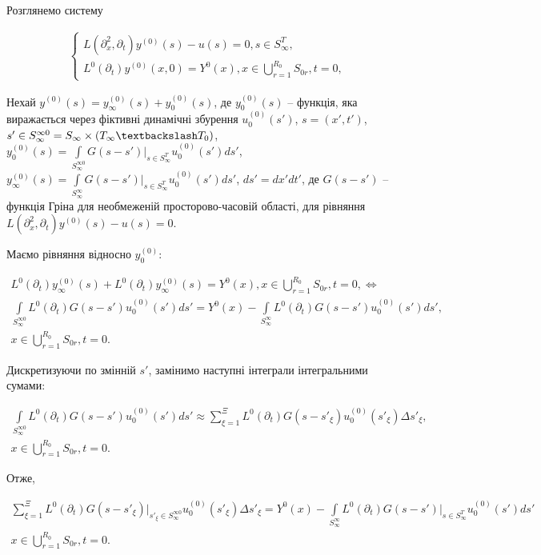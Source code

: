 Розглянемо систему

\begin{gather*}
    \left\{
    \begin{alignedat}{2}
        L(\partial_x^2, \partial_t)y^{(0)}(s) - u(s) = 0, s\in S_\infty^T,\\
        L^{0}(\partial_{t})y^{(0)}(x,0) = Y^{0}(x),x\in\bigcup\limits_{r=1}^{R_{0}} S_{0r},t=0,
    \end{alignedat}
    \right.
\end{gather*}

Нехай $y^{(0)}(s)=y_{\infty}^{(0)}(s) + y_{0}^{(0)}(s)$,
де $y_{0}^{(0)}(s)$ -- функція, яка виражається через фіктивні динамічні збурення
$u^{(0)}_{0}(s')$,
$s=(x', t')$,
$s'\in S_{\infty}^{\infty 0} = S_{\infty} \times (T_{\infty}\textbackslash T_{0})$,
$y_{0}^{(0)}(s)=\int\limits_{S_{\infty}^{\infty 0}}G(s-s')\bigg|_{s\in S_{\infty}^{T}}u_{0}^{(0)}(s')ds'$,
$y_{\infty}^{(0)}(s)=\int\limits_{S_{\infty}^{\infty}}G(s-s')\bigg|_{s\in S_{\infty}^{T}}u_{0}^{(0)}(s')ds'$,
$ds'=dx'dt'$,
де $G(s-s')$ -- функція Гріна для необмеженій просторово-часовій області, для рівняння
$L(\partial_x^2, \partial_t)y^{(0)}(s) - u(s) = 0$.

Маємо рівняння відносно $y_{0}^{(0)}$:

\begin{gather*}
L^{0}(\partial_{t})y_{\infty}^{(0)}(s) + L^{0}(\partial_{t})y_{\infty}^{(0)}(s) = Y^{0}(x),
x\in\bigcup\limits_{r=1}^{R_{0}} S_{0r},t=0,\Leftrightarrow\\
    \int\limits_{S_{\infty}^{\infty 0}}L^{0}(\partial_{t})G(s-s')u_{0}^{(0)}(s')ds' =
    Y^{0}(x)-\int\limits_{S_{\infty}^{\infty}} L^{0}(\partial_{t})G(s-s')u_{0}^{(0)}(s')ds',\\
x\in\bigcup\limits_{r=1}^{R_{0}} S_{0r},t=0.
\end{gather*}

Дискретизуючи по змінній $s'$, замінимо наступні інтеграли інтегральними сумами:

\begin{gather*}
\int\limits_{S_{\infty}^{\infty 0}}L^{0}(\partial_{t})G(s-s')u_{0}^{(0)}(s')ds' \approx
\sum\limits_{\xi=1}^{\Xi} L^{0}(\partial_{t})G(s-s'_{\xi})u_{0}^{(0)}(s'_{\xi})\Delta s'_{\xi},\\
x\in\bigcup\limits_{r=1}^{R_{0}} S_{0r},t=0.
\end{gather*}

Отже,

\begin{gather*}
    \sum\limits_{\xi=1}^{\Xi} L^{0}(\partial_{t})G(s-s'_{\xi})\bigg|_{s'_{\xi}\in S_{\infty}^{\infty 0}}
    u_{0}^{(0)}(s'_{\xi})\Delta s'_{\xi}
    = Y^{0}(x) - \int\limits_{S_{\infty}^{\infty}} L^{0}(\partial_{t})G(s-s') \bigg|_{s\in S_{\infty}^{T}} u_{0}^{(0)}(s')ds'\\
    x\in\bigcup\limits_{r=1}^{R_{0}} S_{0r},t=0.
\end{gather*}

